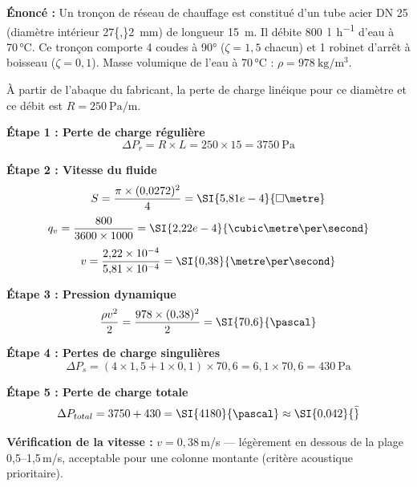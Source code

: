 \begin{exemple}[title=Calcul des pertes de charge d'un tronçon]
\textbf{Énoncé :} Un tronçon de réseau de chauffage est constitué d'un tube acier DN 25 (diamètre intérieur \SI{27{,}2}{\milli\metre}) de longueur \SI{15}{\metre}. Il débite \SI{800}{\litre\per\hour} d'eau à 70\,°C. Ce tronçon comporte 4 coudes à 90° ($\zeta = 1{,}5$ chacun) et 1 robinet d'arrêt à boisseau ($\zeta = 0{,}1$). Masse volumique de l'eau à 70\,°C : $\rho = \SI{978}{\kilogram\per\cubic\metre}$.

À partir de l'abaque du fabricant, la perte de charge linéique pour ce diamètre et ce débit est $R = \SI{250}{\pascal\per\metre}$.

\textbf{Étape 1 : Perte de charge régulière}
\[
  \Delta P_r = R \times L = 250 \times 15 = \SI{3750}{\pascal}
\]

\textbf{Étape 2 : Vitesse du fluide}
\[
  S = \frac{\pi \times (0{,}0272)^2}{4} = \SI{5{,}81e-4}{\square\metre}
\]
\[
  q_v = \frac{800}{3600 \times 1000} = \SI{2{,}22e-4}{\cubic\metre\per\second}
\]
\[
  v = \frac{2{,}22 \times 10^{-4}}{5{,}81 \times 10^{-4}} = \SI{0{,}38}{\metre\per\second}
\]

\textbf{Étape 3 : Pression dynamique}
\[
  \frac{\rho v^2}{2} = \frac{978 \times (0{,}38)^2}{2} = \SI{70{,}6}{\pascal}
\]

\textbf{Étape 4 : Pertes de charge singulières}
\[
  \Delta P_s = \left(4 \times 1{,}5 + 1 \times 0{,}1\right) \times 70{,}6 = 6{,}1 \times 70{,}6 = \SI{430}{\pascal}
\]

\textbf{Étape 5 : Perte de charge totale}
\[
  \Delta P_{total} = 3750 + 430 = \SI{4180}{\pascal} \approx \SI{0{,}042}{\bar}
\]

\textbf{Vérification de la vitesse :} $v = 0{,}38$\,m/s — légèrement en dessous de la plage 0,5–1,5\,m/s, acceptable pour une colonne montante (critère acoustique prioritaire).
\end{exemple}

